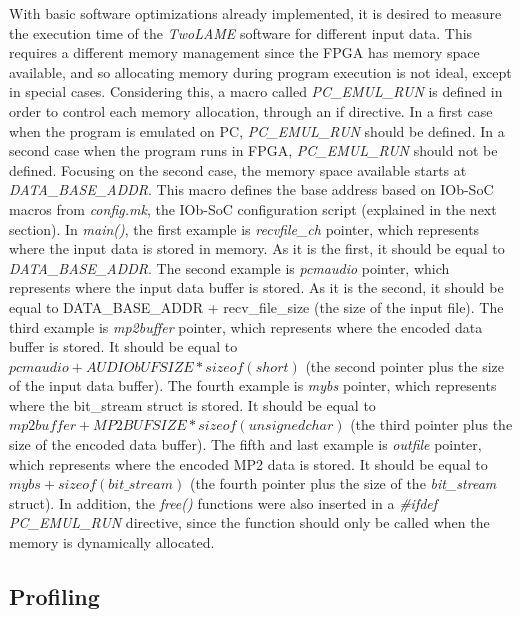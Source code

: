 With basic software optimizations already implemented, it is desired to measure the execution time of the \textit{TwoLAME} software for different input data. This requires a different memory management since the FPGA has memory space available, and so allocating memory during program execution is not ideal, except in special cases. Considering this, a macro called \textit{PC\_EMUL\_RUN} is defined in order to control each memory allocation, through an if directive. In a first case when the program is emulated on PC, \textit{PC\_EMUL\_RUN} should be defined. In a second case when the program runs in FPGA, \textit{PC\_EMUL\_RUN} should not be defined.
Focusing on the second case, the memory space available starts at \textit{DATA\_BASE\_ADDR}. This macro defines the base address based on IOb-SoC macros from \textit{config.mk}, the IOb-SoC configuration script (explained in the next section).
In \textit{main()}, the first example is \textit{recvfile\_ch} pointer, which represents where the input data is stored in memory. As it is the first, it should be equal to \textit{DATA\_BASE\_ADDR}.
The second example is \textit{pcmaudio} pointer, which represents where the input data buffer is stored. As it is the second, it should be equal to DATA\_BASE\_ADDR + recv\_file\_size (the size of the input file).
The third example is \textit{mp2buffer} pointer, which represents where the encoded data buffer is stored. It should be equal to $pcmaudio + AUDIObUFSIZE*sizeof(short)$ (the second pointer plus the size of the input data buffer).
The fourth example is \textit{mybs} pointer, which represents where the bit\_stream struct is stored. It should be equal to $mp2buffer + MP2BUFSIZE*sizeof(unsigned char)$ (the third pointer plus the size of the encoded data buffer).
The fifth and last example is \textit{outfile} pointer, which represents where the encoded MP2 data is stored. It should be equal to $mybs + sizeof(bit\_stream)$ (the fourth pointer plus the size of the \textit{bit\_stream} struct).
In addition, the \textit{free()} functions were also inserted in a \textit{\#ifdef PC\_EMUL\_RUN} directive, since the function should only be called when the memory is dynamically allocated. \\

\subsection{Profiling}

